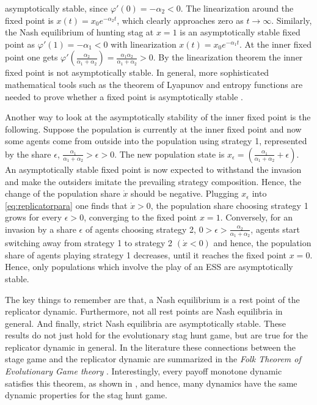 asymptotically stable, since $\varphi'(0) = - \alpha_2 <0$. 
The linearization around the fixed point is $x(t) = x_0 e^{-\alpha_2 t}$, 
which clearly approaches zero as $t \rightarrow \infty$. 
Similarly, the Nash equilibrium 
of hunting stag at $x=1$ is an asymptotically stable fixed point as
$\varphi'(1) = -\alpha_1 <0$ with linearization $x(t) = x_0 e^{-\alpha_1 t}$.
At the inner fixed point one gets 
$\varphi'(\frac{\alpha_2}{\alpha_1+\alpha_2}) = 
\frac{\alpha_1 \alpha_2}{\alpha_1+\alpha_2} >0$. By the linearization theorem
the inner fixed point is not asymptotically stable.
In general, more sophisticated mathematical tools such as the theorem of 
Lyapunov and entropy functions are needed to prove whether a fixed point
is asymptotically stable \parencite{friedman_economic_1998}.

Another way to look at the asymptotically stability of the inner fixed
point is the following.
Suppose the population is currently at the inner fixed point and now 
some agents come from outside into the population
using strategy 1, represented by the share $\epsilon$,
$\frac{\alpha_1}{\alpha_1+\alpha_2}>\epsilon > 0$.
The new population state is 
$x_{\epsilon}=\left(\frac{\alpha_1}{\alpha_1+\alpha_2} + \epsilon\right)$.
An asymptotically stable fixed point is now expected to withstand the invasion
and make the outsiders imitate the prevailing strategy composition. Hence, 
the change of the population share $\dot{x}$ should be negative.
Plugging $x_{\epsilon}$ into
\eqref{eq:replicatorpara} one finds that $\dot{x} >0$, the population share
choosing strategy 1 grows for every $\epsilon >0$, converging to the 
fixed point $x = 1$. Conversely, for an invasion by a share $\epsilon$ 
of agents
choosing strategy 2, $0 > \epsilon > \frac{\alpha_2}{\alpha_1+\alpha_2}$,
agents start switching away from strategy 1 to strategy 2 $(\dot{x} < 0)$ 
and hence, the population share of agents playing strategy 1 
decreases, until it reaches the 
fixed point $x=0$. 
Hence, only populations which involve the play of an ESS are asymptotically 
stable.

The key things to remember are that, a Nash equilibrium is a rest point of
the replicator dynamic. Furthermore, not all rest points are 
Nash equilibria in general. And finally, strict Nash equilibria 
are asymptotically stable. These results do not just hold for
the evolutionary stag hunt game, but are true for the replicator dynamic
in general. In the literature these connections between the stage game
and the replicator dynamic are summarized in the
\textit{Folk Theorem of Evolutionary Game theory} 
\parencite[25]{szabo_evolutionary_2007}. Interestingly, every payoff
monotone dynamic satisfies this theorem, as shown in 
\textcite{hofbauer_evolutionary_2003}, and hence, many dynamics have the same
dynamic properties for the stag hunt game. 

